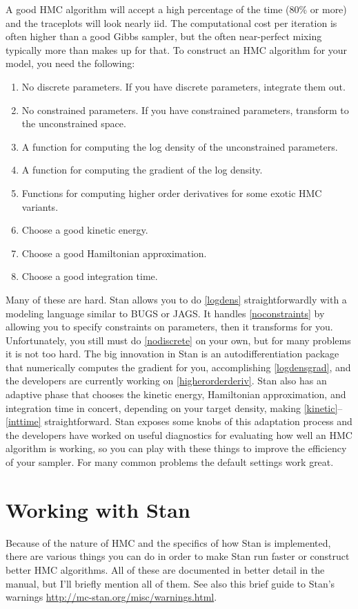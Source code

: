\documentclass{article}
\begin{document}
A good HMC algorithm will accept a high percentage of the time (80\% or more) and the traceplots will look nearly iid. The computational cost per iteration is often higher than a good Gibbs sampler, but the often near-perfect mixing typically more than makes up for that. To construct an HMC algorithm for your model, you need the following:
\begin{enumerate}
\item No discrete parameters. If you have discrete parameters, integrate them out. \label{nodiscrete}
\item No constrained parameters. If you have constrained parameters, transform to the unconstrained space. \label{noconstraints}
\item A function for computing the log density of the unconstrained parameters. \label{logdens}
\item A function for computing the gradient of the log density. \label{logdensgrad}
\item Functions for computing higher order derivatives for some exotic HMC variants. \label{higherorderderiv}
\item Choose a good kinetic energy. \label{kinetic}
\item Choose a good Hamiltonian approximation. \label{hamapprox}
\item Choose a good integration time. \label{inttime}
\end{enumerate}
Many of these are hard. Stan allows you to do \eqref{logdens} straightforwardly with a modeling language similar to BUGS or JAGS. It handles \eqref{noconstraints} by allowing you to specify constraints on parameters, then it transforms for you. Unfortunately, you still must do \eqref{nodiscrete} on your own, but for many problems it is not too hard. The big innovation in Stan is an autodifferentiation package that numerically computes the gradient for you, accomplishing \eqref{logdensgrad}, and the developers are currently working on \eqref{higherorderderiv}. Stan also has an adaptive phase that chooses the kinetic energy, Hamiltonian approximation, and integration time in concert, depending on your target density, making \eqref{kinetic}--\eqref{inttime} straightforward. Stan exposes some knobs of this adaptation process and the developers have worked on useful diagnostics for evaluating how well an HMC algorithm is working, so you can play with these things to improve the efficiency of your sampler. For many common problems the default settings work great.

\section{Working with Stan}
Because of the nature of HMC and the specifics of how Stan is implemented, there are various things you can do in order to make Stan run faster or construct better HMC algorithms. All of these are documented in better detail in the manual, but I'll briefly mention all of them. See also this brief guide to Stan's warnings \url{http://mc-stan.org/misc/warnings.html}.
\end{document}

